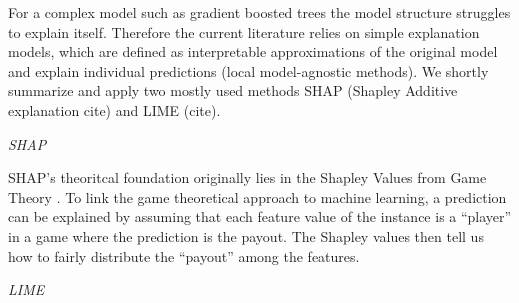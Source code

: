 \documentclass[12pt,titlepage]{article}
\begin{document}
For a complex model such as gradient boosted trees the model structure struggles to explain itself. Therefore the current literature relies on simple explanation models, which are defined as interpretable approximations of the original model and explain individual predictions (local model-agnostic methods). We shortly summarize and apply two mostly used methods SHAP (Shapley Additive explanation cite) and LIME (cite).
\vspace{3mm}

\textit{SHAP}

SHAP's theoritcal foundation originally lies in the Shapley Values from Game Theory \cite{shapley}. To link the game theoretical approach to machine learning, a prediction can be explained by assuming that each feature value of the instance is a “player” in a game where the prediction is the payout. The Shapley values then tell us how to fairly distribute the “payout” among the features. \\


\vspace{3mm}

\textit{LIME}
\newpage

\thispagestyle{empty}

\printbibliography

\vspace*{6mm}
\end{document}
